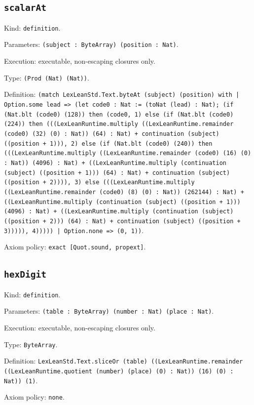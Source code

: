 \documentclass[11pt]{article}
\begin{document}
\subsection*{\texttt{scalarAt}}
\noindent Kind: \texttt{definition}.\par
\noindent Parameters: \texttt{(subject : ByteArray) (position : Nat)}.\par
\noindent Execution: executable, non-escaping closures only.\par
\noindent Type: \texttt{(Prod (Nat) (Nat))}.\par
\noindent Definition: \texttt{(match LexLeanStd.Text.byteAt (subject) (position) with | Option.some lead => (let code0 : Nat := (toNat (lead) : Nat); (if (Nat.blt (code0) (128)) then (code0, 1) else (if (Nat.blt (code0) (224)) then (((LexLeanRuntime.multiply ((LexLeanRuntime.remainder (code0) (32) (0) : Nat)) (64) : Nat) + continuation (subject) ((position + 1))), 2) else (if (Nat.blt (code0) (240)) then (((LexLeanRuntime.multiply ((LexLeanRuntime.remainder (code0) (16) (0) : Nat)) (4096) : Nat) + ((LexLeanRuntime.multiply (continuation (subject) ((position + 1))) (64) : Nat) + continuation (subject) ((position + 2)))), 3) else (((LexLeanRuntime.multiply ((LexLeanRuntime.remainder (code0) (8) (0) : Nat)) (262144) : Nat) + ((LexLeanRuntime.multiply (continuation (subject) ((position + 1))) (4096) : Nat) + ((LexLeanRuntime.multiply (continuation (subject) ((position + 2))) (64) : Nat) + continuation (subject) ((position + 3))))), 4))))) | Option.none => (0, 1))}.\par
\noindent Axiom policy: \texttt{exact [Quot.sound, propext]}.\par
\subsection*{\texttt{hexDigit}}
\noindent Kind: \texttt{definition}.\par
\noindent Parameters: \texttt{(table : ByteArray) (number : Nat) (place : Nat)}.\par
\noindent Execution: executable, non-escaping closures only.\par
\noindent Type: \texttt{ByteArray}.\par
\noindent Definition: \texttt{LexLeanStd.Text.sliceOr (table) ((LexLeanRuntime.remainder ((LexLeanRuntime.quotient (number) (place) (0) : Nat)) (16) (0) : Nat)) (1)}.\par
\noindent Axiom policy: \texttt{none}.\par
\end{document}
